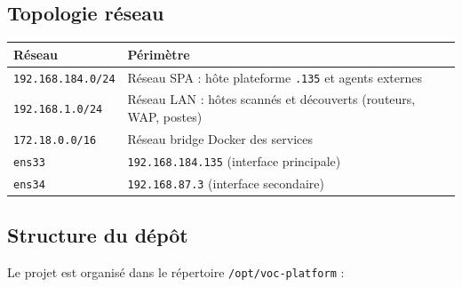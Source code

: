 \documentclass[11pt,a4paper]{article}
\begin{document}
\subsection{Topologie r\'eseau}

\begin{center}
\small
\begin{tabularx}{\linewidth}{@{}l X@{}}
\toprule
\textbf{R\'eseau} & \textbf{P\'erim\`etre} \\
\midrule
\texttt{192.168.184.0/24} & R\'eseau SPA : h\^ote plateforme \texttt{.135} et agents externes \\
\texttt{192.168.1.0/24} & R\'eseau LAN : h\^otes scann\'es et d\'ecouverts (routeurs, WAP, postes) \\
\texttt{172.18.0.0/16} & R\'eseau bridge Docker des services \\
\texttt{ens33} & \texttt{192.168.184.135} (interface principale) \\
\texttt{ens34} & \texttt{192.168.87.3} (interface secondaire) \\
\bottomrule
\end{tabularx}
\end{center}

\subsection{Structure du d\'ep\^ot}

Le projet est organis\'e dans le r\'epertoire \texttt{/opt/voc-platform} :
\end{document}
